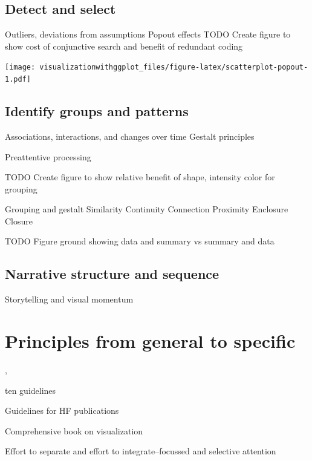 \documentclass[]{krantz}
\begin{document}
\hypertarget{detect-and-select}{%
\subsection{Detect and select}\label{detect-and-select}}

Outliers, deviations from assumptions
Popout effects
TODO Create figure to show cost of conjunctive search and benefit of redundant coding

\texttt{[image: visualizationwithggplot\_files/figure-latex/scatterplot-popout-1.pdf]}

\hypertarget{identify-groups-and-patterns}{%
\subsection{Identify groups and patterns}\label{identify-groups-and-patterns}}

Associations, interactions, and changes over time
Gestalt principles

Preattentive processing

TODO Create figure to show relative benefit of shape, intensity color for grouping

Grouping and gestalt
Similarity
Continuity
Connection
Proximity
Enclosure
Closure

TODO Figure ground showing data and summary vs summary and data

\hypertarget{narrative-structure-and-sequence}{%
\subsection{Narrative structure and sequence}\label{narrative-structure-and-sequence}}

Storytelling and visual momentum

\hypertarget{principles-from-general-to-specific}{%
\section{Principles from general to specific}\label{principles-from-general-to-specific}}

\citep{Tufte1983}, \citep[\citet{Gelman2013a}]{Munzner2014}

ten guidelines \citep{Kelleher2011a}

Guidelines for HF publications \citep{Gillan1998}

Comprehensive book on visualization \citep{Ware2013}

Effort to separate and effort to integrate--focussed and selective attention
\end{document}
